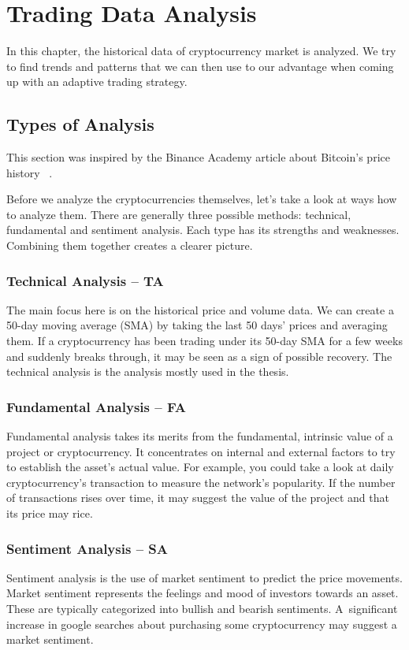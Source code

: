 \chapter{Trading Data Analysis}
\label{chapter-data-analysis}

In this chapter, the historical data of cryptocurrency market is analyzed. We try to find trends and patterns that we can then use to our advantage when coming up with an adaptive trading strategy.

\section{Types of Analysis}
This section was inspired by the Binance Academy article about Bitcoin's price history ~\cite{binance:bitcoin-price-history}.

Before we analyze the cryptocurrencies themselves, let's take a look at ways how to analyze them. There are generally three possible methods: technical, fundamental and sentiment analysis. Each type has its strengths and weaknesses. Combining them together creates a clearer picture.

\subsection*{Technical Analysis -- TA}
The main focus here is on the historical price and volume data. We can create a 50-day moving average (SMA) by taking the last 50 days' prices and averaging them. If a cryptocurrency has been trading under its 50-day SMA for a few weeks and suddenly breaks through, it may be seen as a sign of possible recovery. The technical analysis is the analysis mostly used in the thesis.

\subsection*{Fundamental Analysis -- FA}
Fundamental analysis takes its merits from the fundamental, intrinsic value of a project or cryptocurrency. It concentrates on internal and external factors to try to establish the asset's actual value. For example, you could take a look at daily cryptocurrency's transaction to measure the network's popularity. If the number of transactions rises over time, it may suggest the value of the project and that its price may rice.

\subsection*{Sentiment Analysis -- SA}
Sentiment analysis is the use of market sentiment to predict the price movements. Market sentiment represents the feelings and mood of investors towards an asset. These are typically categorized into bullish and bearish sentiments. A~significant increase in google searches about purchasing some cryptocurrency may suggest a market sentiment.

